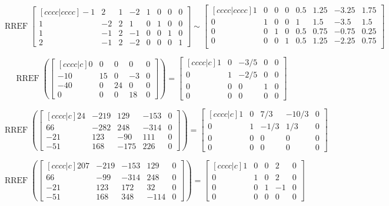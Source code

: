 \documentclass{article}
\DeclareMathOperator{\RREF}{RREF}
\begin{document}
\[\RREF  \begin{bmatrix}[cccc|cccc]
-1  & 2&   1&  -2&   1&   0&   0&   0\\
1  &-2  & 2   &1  & 0  & 1  & 0   &0\\
1  &-1 &  2 & -1 &  0 &  0 &  1 &  0\\
2 & -1  & 2 & -2  & 0 &  0  & 0  & 1
\end{bmatrix}\sim\begin{bmatrix}[cccc|cccc]
1  &0 &  0 &  0&    0.5&   1.25&   -3.25&   1.75\\
0 &1 &  0 &  0 &   1    & 1.5&    -3.5 &   1.5\\
0  & 0 &  1 &  0  &  0.5  &0.75 &  -0.75  & 0.25\\
0  & 0 &  0 &  1    &0.5 &  1.25 &  -2.25 &  0.75\\
\end{bmatrix}\]



\[
\RREF\left(
\begin{bmatrix} [cccc|c]
0 & 0 & 0 & 0 & 0 \\ 
-10 & 15 & 0 & -3 & 0 \\ 
-40 & 0 & 24 & 0 & 0 \\ 
0 & 0 & 0 & 18 & 0 
\end{bmatrix}
\right) =
  \begin{bmatrix}[cccc|c]
    1 & 0 & -3/5 & 0 & 0 \\
    0 & 1 & -2/5 & 0 & 0 \\
    0 & 0 & 0 & 1 & 0 \\
    0 & 0 & 0 & 0 & 0
  \end{bmatrix}
\]


\[
\RREF\left(
\begin{bmatrix}  [cccc|c]
24& -219 & 129 & -153 &0 \\
66 & -282 & 248 & -314 &0\\
-21 & 123 & -90& 111 &0 \\
-51 & 168 & -175 &226 &0
\end{bmatrix}
\right) =
  \begin{bmatrix}[cccc|c]
    1 & 0 & 7/3 & -10/3 & 0 \\
    0 & 1 & -1/3 & 1/3 & 0 \\
    0 & 0 & 0 & 0 & 0 \\
    0 & 0 & 0 & 0 & 0
  \end{bmatrix}
\]


\[
\RREF\left(
\begin{bmatrix} [cccc|c]
207 & -219 & -153 & 129 &0 \\
66 & -99 & -314 & 248 &0 \\
-21 & 123 & 172 & 32&0 \\
-51 & 168 & 348 & -114 &0
\end{bmatrix}
\right) =
  \begin{bmatrix}[cccc|c]
    1 & 0 & 0 & 2 & 0 \\
    0 & 1 & 0 & 2 & 0 \\
    0 & 0 & 1 & -1 & 0 \\
    0 & 0 & 0 & 0 & 0
  \end{bmatrix}
\]
\end{document}
